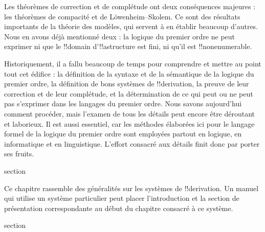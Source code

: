 \documentclass[11pt,a4paper,openany]{memoir}
\begin{document}
Les théorèmes de correction et de complétude ont deux conséquences
majeures : les théorèmes de compacité et de L\"owenheim--Skolem. Ce sont
des résultats importants de la théorie des modèles, qui servent à en
établir beaucoup d'autres. Nous en avons déjà mentionné deux : la
logique du premier ordre ne peut exprimer ni que le !!{domain}
d'!!a{structure} est fini, ni qu'il est !!{nonenumerable}.

Historiquement, il a fallu beaucoup de temps pour comprendre et mettre
au point tout cet édifice : la définition de la syntaxe et de la
sémantique de la logique du premier ordre, la définition de bons
systèmes de !!{derivation}, la preuve de leur correction et de leur
complétude, et la détermination de ce qui peut ou ne peut pas s'exprimer
dans les langages du premier ordre. Nous savons aujourd'hui comment
procéder, mais l'examen de tous les détails peut encore être déroutant
et laborieux. Il est aussi essentiel, car les méthodes élaborées ici
pour le langage formel de la logique du premier ordre sont employées
partout en logique, en informatique et en linguistique. L'effort
consacré aux détails finit donc par porter ses fruits.


\endgroup


\OLEndChapterHook


\endgroup


\begingroup
\expandafter\def\csname ol@sectioncs\endcsname{section}
\def\olfilename{proof-systems}


      {}
      {}

\begin{editorial}
Ce chapitre rassemble des généralités sur les systèmes de
!!{derivation}. Un manuel qui utilise un système particulier peut placer
l'introduction et la section de présentation correspondante au début
du chapitre consacré à ce système.
\end{editorial}


\begingroup
\expandafter\def\csname ol@sectioncs\endcsname{section}
\def\olfilename{introduction}
\end{document}
